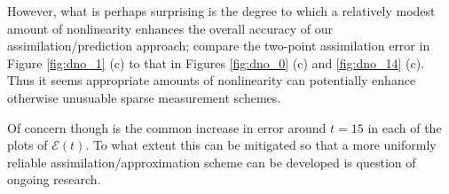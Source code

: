 However, what is perhaps surprising is the degree to which a relatively modest amount of nonlinearity enhances the overall accuracy of our assimilation/prediction approach; compare the two-point assimilation error in Figure \ref{fig:dno_1} (c) to that in Figures \ref{fig:dno_0} (c) and \ref{fig:dno_14} (c).  Thus it seems appropriate amounts of nonlinearity can potentially enhance otherwise unusuable sparse measurement schemes.  

Of concern though is the common increase in error around $t=15$ in each of the plots of $\mathcal{E}(t)$.  To what extent this can be mitigated so that a more uniformly reliable assimilation/approximation scheme can be developed is question of ongoing research.  
